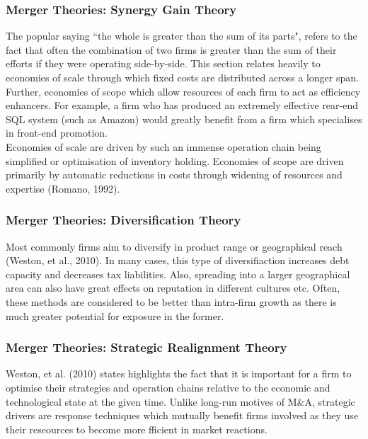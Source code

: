 \documentclass[11pt, english]{article}
\begin{document}
		\subsubsection*{Merger Theories: Synergy Gain Theory}

	The popular saying ``the whole is greater than the sum of its parts", refers to the fact that often the combination of two firms is greater than the sum of their efforts if they were operating side-by-side. This section relates heavily to economies of scale  through which fixed costs are distributed across a longer span. Further, economies of scope which allow resources of each firm to act as efficiency enhancers. For example, a firm who has produced an extremely effective rear-end SQL system (such as Amazon) would greatly benefit from a firm which specialises in front-end promotion.\\

	Economies of scale are driven by such an immense operation chain being simplified or optimisation of inventory holding. Economies of scope are driven primarily by automatic reductions in costs through widening of resources and expertise (Romano, 1992).

		\subsubsection*{Merger Theories: Diversification Theory}

	Most commonly firms aim to diversify in product range or geographical reach (Weston, et al., 2010). In many cases, this type of diversifiaction increases debt capacity and decreases tax liabilities. Also, spreading into a larger geographical area can also have great effects on reputation in different cultures etc. Often, these methods are considered to be better than intra-firm growth as there is much greater potential for exposure in the former.

		\subsubsection*{Merger Theories: Strategic Realignment Theory}

	Weston, et al. (2010) states highlights the fact that it is important for a firm to optimise their strategies and operation chains relative to the economic and technological state at the given time. Unlike long-run motives of M\&A, strategic drivers are response techniques which mutually benefit firms involved as they use their reseources to become more fficient in market reactions.
\end{document}
